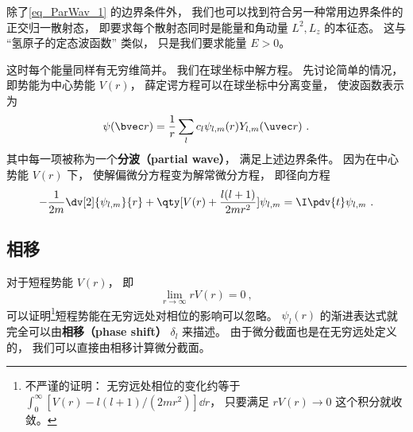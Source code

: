 除了\autoref{eq_ParWav_1} 的边界条件外， 我们也可以找到符合另一种常用边界条件的正交归一散射态， 即要求每个散射态同时是能量和角动量 $L^2, L_z$ 的本征态。 这与 “氢原子的定态波函数” 类似， 只是我们要求能量 $E > 0$。

这时每个能量同样有无穷维简并。 我们在球坐标中解方程。 先讨论简单的情况， 即势能为中心势能 $V(r)$， 薛定谔方程可以在球坐标中分离变量， 使波函数表示为 %
\begin{equation}
\psi(\bvec r) = \frac{1}{r} \sum_l c_l \psi_{l,m}(r) Y_{l,m}(\uvec r)~.
\end{equation}
其中每一项被称为一个\textbf{分波（partial wave）}， 满足上述边界条件。 因为在中心势能 $V(r)$ 下， 使解偏微分方程变为解常微分方程， 即径向方程 %
\begin{equation}
-\frac{1}{2m} \dv[2]{\psi_{l,m}}{r} + \qty[V(r) + \frac{l(l + 1)}{2mr^2}]\psi_{l,m} = \I \pdv{t} \psi_{l,m}~.
\end{equation}

\subsection{相移}
对于短程势能 $V(r)$， 即
\begin{equation}
\lim_{r\to\infty} r V(r) = 0~,
\end{equation}
可以证明\footnote{不严谨的证明： 无穷远处相位的变化约等于 $\int_0^\infty [V(r) - l(l+1)/(2mr^2)]\dd{r}$， 只要满足 $rV(r) \to 0$ 这个积分就收敛。}短程势能在无穷远处对相位的影响可以忽略。 $\psi_l(r)$ 的渐进表达式就完全可以由\textbf{相移（phase shift）} $\delta_l$ 来描述。 由于微分截面也是在无穷远处定义的， 我们可以直接由相移计算微分截面。

